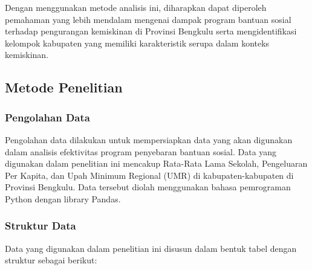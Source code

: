 \documentclass[12pt,a4paper]{article}
\begin{document}
\begin{multicols}{2}
Dengan menggunakan metode analisis ini, diharapkan dapat diperoleh pemahaman yang lebih mendalam mengenai dampak program bantuan sosial terhadap pengurangan kemiskinan di Provinsi Bengkulu serta mengidentifikasi kelompok kabupaten yang memiliki karakteristik serupa dalam konteks kemiskinan.





\subsection{Metode Penelitian}

\subsubsection{Pengolahan Data}
Pengolahan data dilakukan untuk mempersiapkan data yang akan digunakan dalam analisis efektivitas program penyebaran bantuan sosial. Data yang digunakan dalam penelitian ini mencakup Rata-Rata Lama Sekolah, Pengeluaran Per Kapita, dan Upah Minimum Regional (UMR) di kabupaten-kabupaten di Provinsi Bengkulu. Data tersebut diolah menggunakan bahasa pemrograman Python dengan library Pandas.

\subsubsection{Struktur Data}
Data yang digunakan dalam penelitian ini disusun dalam bentuk tabel dengan struktur sebagai berikut:

\begin{table}[H]
\centering
\caption{Rata-rata Lama Sekolah, Pengeluaran Per Kapita, dan UMR per Kabupaten (2020--2024)}
\label{tab:tabel_kabupaten}
\end{table}




\end{multicols}
\end{document}

